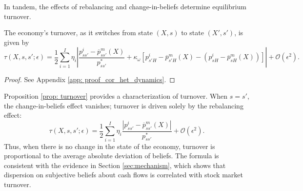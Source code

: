 In tandem, the effects of rebalancing and change-in-beliefs determine equilibrium turnover. 
\begin{proposition}[Turnover]\label{prop: turnover} 
The economy's turnover, as it switches from state $(X,s)$ to state $(X',s')$, is given by
\begin{equation}\label{eq: turnover}
    \tau(X,s,s';\epsilon) = \frac{1}{2} \sum_{i=1}^I \eta_i\left\lvert  \frac{p_{ss'}^i - \overline{p}_{ss'}^m(X)}{p_{ss'}^*} +\kappa_\omega\left[p_{s'H}^i - \overline{p}_{s'H}^m(X) - (p_{sH}^i - \overline{p}^m_{sH}(X)) \right] \right\rvert  + \mathcal{O}(\epsilon^2).
\end{equation}
\end{proposition}
\begin{proof}
See Appendix \ref{app: proof_cor_het_dynamics}.
\end{proof}

Proposition \ref{prop: turnover} provides a characterization of turnover. When $s = s'$, the change-in-beliefs effect vanishes; turnover is driven solely by the rebalancing effect:
\begin{equation}
    \tau(X,s,s';\epsilon) = \frac{1}{2} \sum_{i=1}^I \eta_i \frac{|p_{ss'}^i - \overline{p}_{ss'}^m(X)|}{p_{ss'}^*} + \mathcal{O}(\epsilon^2).\nonumber
\end{equation}
Thus, when there is no change in the state of the economy,  turnover is proportional to the average absolute deviation of beliefs. The formula is consistent with the evidence in Section \ref{sec:mechanism}, which shows that dispersion on subjective beliefs about cash flows is correlated with stock market turnover.  

